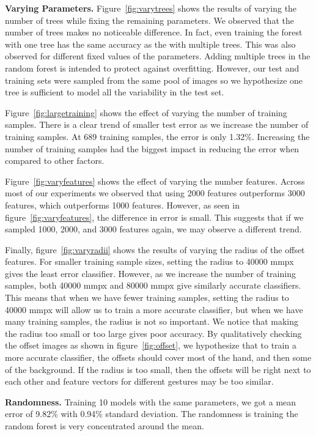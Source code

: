 \textbf{Varying Parameters.} Figure~\ref{fig:varytrees} shows the results of varying the number of trees while fixing the remaining parameters. We observed that the number of trees makes no noticeable difference. In fact, even training the forest with one tree has the same accuracy as the with multiple trees. This was also observed for different fixed values of the parameters. Adding multiple trees in the random forest is intended to protect against overfitting. However, our test and training sets were sampled from the same pool of images so we hypothesize one tree is sufficient to model all the variability in the test set. 

Figure~\ref{fig:largetraining} shows the effect of varying the number of training samples. There is a clear trend of smaller test error as we increase the number of training samples. At 689 training samples, the error is only 1.32\%. Increasing the number of training samples had the biggest impact in reducing the error when compared to other factors. 

Figure~\ref{fig:varyfeatures} shows the effect of varying the number features. Across most of our experiments we observed that using 2000 features outperforms 3000 features, which outperforms 1000 features. However, as seen in figure~\ref{fig:varyfeatures}, the difference in error is small. This suggests that if we sampled 1000, 2000, and 3000 features again, we may observe a different trend.

Finally, figure~\ref{fig:varyradii} shows the results of varying the radius of the offset features. For smaller training sample sizes, setting the radius to 40000 mmpx gives the least error classifier. However, as we increase the number of training samples, both 40000 mmpx and 80000 mmpx give similarly accurate classifiers. This means that when we have fewer training samples, setting the radius to 40000 mmpx will allow us to train a more accurate classifier, but when we have many training samples, the radius is not so important. We notice that making the radius too small or too large gives poor accuracy. By qualitatively checking the offset images as shown in figure~\ref{fig:offset}, we hypothesize that to train a more accurate classifier, the offsets should cover most of the hand, and then some of the background. If the radius is too small, then the offsets will be right next to each other and feature vectors for different gestures may be too similar.

\textbf{Randomness.} Training 10 models with the same parameters, we got a mean error of 9.82\% with 0.94\% standard deviation. The randomness is training the random forest is very concentrated around the mean. 


